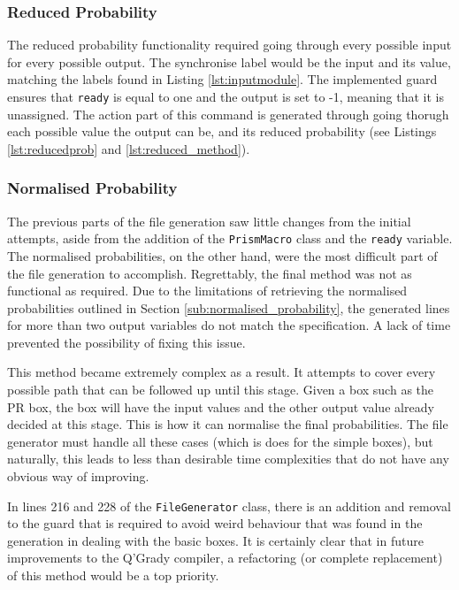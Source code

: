 \documentclass[report.tex]{subfiles}
\begin{document}
\subsubsection{Reduced Probability} %
\label{ssub:reduced_probability}
The reduced probability functionality required going through every possible
input for every possible output. The synchronise label would be the input and
its value, matching the labels found in Listing \ref{lst:inputmodule}. The
implemented guard ensures that \texttt{ready} is equal to one and the output
is set to -1, meaning that it is unassigned. The action part of this command is
generated through going thorugh each possible value the output can be, and its
reduced probability (see Listings \ref{lst:reducedprob} and 
\ref{lst:reduced_method}).

\subsubsection{Normalised Probability} %
\label{ssub:normalised_probability}
The previous parts of the file generation saw little changes from the initial
attempts, aside from the addition of the \texttt{PrismMacro} class and the
\texttt{ready} variable. The normalised probabilities, on the other hand, were
the most difficult part of the file generation to accomplish. Regrettably, the
final method was not as functional as required. Due to the limitations of
retrieving the normalised probabilities outlined in Section 
\ref{sub:normalised_probability}, the generated lines for more than two output
variables do not match the specification. A lack of time prevented the
possibility of fixing this issue.

This method became extremely complex as a result. It attempts to cover every
possible path that can be followed up until this stage. Given a box such as the
PR box, the box will have the input values and the other output value already
decided at this stage. This is how it can normalise the final probabilities.
The file generator must handle all these cases (which is does for the simple
boxes), but naturally, this leads to less than desirable time complexities
that do not have any obvious way of improving.

In lines 216 and 228 of the \texttt{FileGenerator} class,  there is an addition
and removal to the guard that is required to avoid weird behaviour that was
found in the generation in dealing with the basic boxes. It is certainly clear
that in future improvements to the Q'Grady compiler, a refactoring (or complete
replacement) of this method would be a top priority.

\newpage
\end{document}
